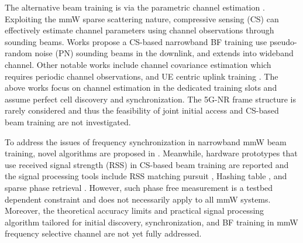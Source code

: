 \documentclass[journal]{IEEEtran}
\begin{document}
The alternative beam training is via the parametric channel estimation \cite{7390019,7178503,8306126,7472310,8356247,8488662,8323164,7914742}. Exploiting the mmW sparse scattering nature, compressive sensing (CS) can effectively estimate channel parameters using channel observations through sounding beams. Works \cite{7390019,7178503} propose a CS-based narrowband BF training use pseudo-random noise (PN) sounding beams in the downlink, and \cite{8306126} extends into wideband channel. Other notable works include channel covariance estimation \cite{7472310,8356247,8488662} which requires periodic channel observations, and UE centric uplink training \cite{8323164,7914742}. The above works focus on channel estimation in the dedicated training slots and assume perfect cell discovery and synchronization. The 5G-NR frame structure is rarely considered and thus the feasibility of joint initial access and CS-based beam training are not investigated. 


To address the issues of frequency synchronization in narrowband mmW beam training, novel algorithms are proposed in \cite{hyan_mmWave_CFO,Myers_CFO_SPAWC_1707,8309152,Myers_CFO_arxiv_1803}. Meanwhile, hardware prototypes that use received signal strength (RSS) in CS-based beam training are reported and the signal processing tools include RSS matching pursuit \cite{Rasekh_noncoherentCS_ACM_2017}, Hashing table \cite{Hassanieh:2018:FMW:3230543.3230581}, and sparse phase retrieval \cite{UCSB_noncoherentCS_arxiv_1801}. However, such phase free measurement is a testbed dependent constraint and does not necessarily apply to all mmW systems. Moreover, the theoretical accuracy limits and practical signal processing algorithm tailored for initial discovery, synchronization, and BF training in mmW frequency selective channel are not yet fully addressed. 




\end{document}
